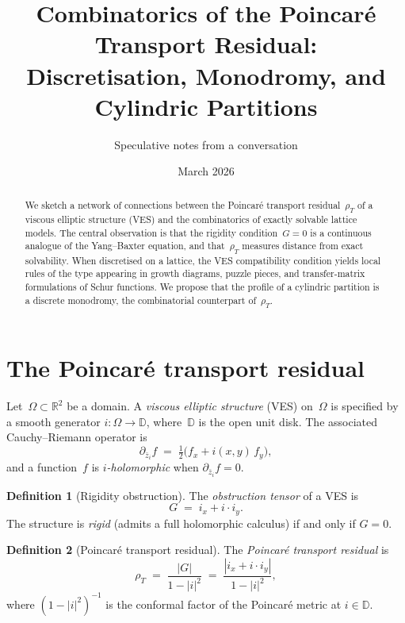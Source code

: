 \documentclass[11pt]{article}
\title{Combinatorics of the Poincar\'e Transport Residual:\\
  Discretisation, Monodromy, and Cylindric Partitions}
\author{Speculative notes from a conversation}
\date{March 2026}
\newcommand{\D}{\mathbb{D}}
\newcommand{\R}{\mathbb{R}}
\newcommand{\rhoT}{\rho_T}
\newcommand{\dzbar}{\partial_{\bar{z}_i}}
\theoremstyle{plain}
\theoremstyle{definition}
\newtheorem{definition}{Definition}
\theoremstyle{remark}
\begin{document}
\maketitle

\begin{abstract}
We sketch a network of connections between the Poincar\'e transport
residual~$\rhoT$ of a viscous elliptic structure (VES) and the
combinatorics of exactly solvable lattice models. The central
observation is that the rigidity condition~$G=0$ is a continuous
analogue of the Yang--Baxter equation, and that~$\rhoT$ measures
distance from exact solvability. When discretised on a lattice, the
VES compatibility condition yields local rules of the type appearing
in growth diagrams, puzzle pieces, and transfer-matrix formulations of
Schur functions. We propose that the profile of a cylindric partition
is a discrete monodromy, the combinatorial counterpart of~$\rhoT$.
\end{abstract}

\tableofcontents

\section{The Poincar\'e transport residual}

Let~$\Omega\subset\R^2$ be a domain. A \emph{viscous elliptic
structure} (VES) on~$\Omega$ is specified by a smooth generator
$i\colon\Omega\to\D$, where~$\D$ is the open unit disk. The
associated Cauchy--Riemann operator is
\[
  \dzbar f \;=\; \tfrac{1}{2}\bigl(f_x + i(x,y)\,f_y\bigr),
\]
and a function~$f$ is \emph{$i$-holomorphic} when $\dzbar f = 0$.

\begin{definition}[Rigidity obstruction]
The \emph{obstruction tensor} of a VES is
\[
  G \;=\; i_x + i\cdot i_y.
\]
The structure is \emph{rigid} (admits a full holomorphic calculus)
if and only if $G=0$.
\end{definition}

\begin{definition}[Poincar\'e transport residual]
The \emph{Poincar\'e transport residual} is
\[
  \boxed{\rhoT \;=\; \frac{|G|}{1-|i|^2}
         \;=\; \frac{|i_x + i\cdot i_y|}{1-|i|^2},}
\]
where $(1-|i|^2)^{-1}$ is the conformal factor of the Poincar\'e
metric at $i\in\D$.
\end{definition}
\end{document}
